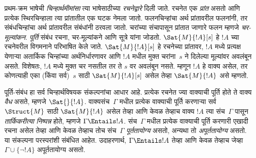 प्रथम-क्रम भाषेची \emph{चिन्हार्थमीमांसा} त्या भाषेसाठीच्या \emph{रचनेद्वारे} दिली जाते. रचनेत एक \emph{प्रांत} असतो आणि प्रत्येक स्थिरचिन्हाला त्या प्रांतातील एक घटक नेमला जातो. फलनचिन्हांचा अर्थ प्रांतावरील फलनांनी, तर संबंधचिन्हांचा अर्थ प्रांतावरील संबंधांनी ठरवला जातो. चरांच्या संचापासून प्रांतात जाणारे फलन म्हणजे \emph{चर-मूल्यांकन}. \emph{पूर्ति} संबंध रचना, चर-मूल्यांकने आणि सूत्रे यांना जोडतो. $\Sat{M}{!A}[s]$ हे $!A$ च्या रचनेवरील विगमनाने परिभाषित केले जाते. $\Sat{M}{!A}[s]$ हे रचनेच्या प्रांतावर, $!A$ मध्ये प्रत्यक्ष येणाऱ्या अतार्किक चिन्हांच्या अर्थनिर्धारणावर आणि $!A$ मधील मुक्त चरांना~$s$ ने दिलेल्या मूल्यांवर अवलंबून असते. विशेषतः, $!A$ मध्ये मुक्त चर नसतील तर ते $s$ वर अवलंबून नसते. म्हणून $!A$ हे वाक्य असेल, तर कोणत्याही एका (किंवा सर्व)~$s$ साठी $\Sat{M}{!A}[s]$ असेल तेव्हा $\Sat{M}{!A}$ असे म्हणतो.

पूर्ति-संबंध हा सर्व चिन्हार्थविषयक संकल्पनांचा आधार आहे. प्रत्येक रचनेत ज्या वाक्याची पूर्ति होते ते वाक्य \emph{वैध} असते, म्हणजे $\Sat{{}}{!A}$. वाक्यसंच~$\Gamma$ मधील प्रत्येक वाक्याची पूर्ति करणाऱ्या सर्व $\Struct{M}$ साठी $\Sat{M}{!A}$ असेल तेव्हा आणि केवळ तेव्हाच वाक्य $!A$ त्या संच~$\Gamma$ पासून \emph{तार्किकरीत्या निष्पन्न} होते, म्हणजे $\Gamma \Entails !A$. संच~$\Gamma$ मधील प्रत्येक वाक्याची पूर्ति करणारी एखादी रचना असेल तेव्हा आणि केवळ तेव्हाच तोच संच~$\Gamma$ \emph{पूर्ततायोग्य} असतो, अन्यथा तो \emph{अपूर्ततायोग्य} असतो. या संकल्पना परस्परांशी संबंधित आहेत. उदाहरणार्थ, $\Gamma \Entails !A$ तेव्हा आणि केवळ तेव्हाच जेव्हा $\Gamma \cup \{\lnot !A\}$ अपूर्ततायोग्य असतो.

